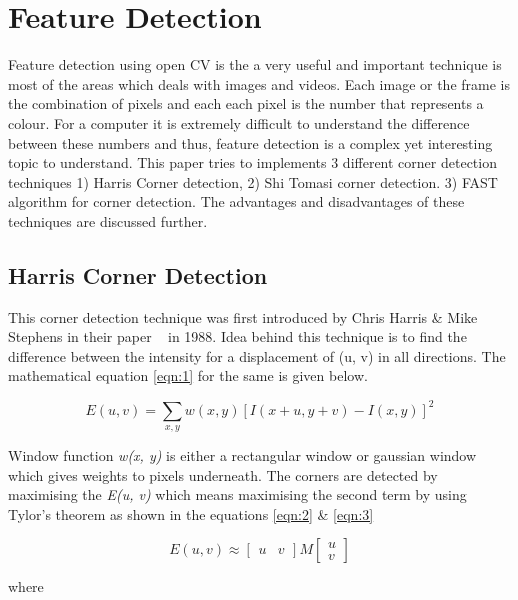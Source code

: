 \chapter{Feature Detection}
Feature detection using open CV is the a very useful and important technique is most of the areas which deals with images and videos. Each image or the frame is the combination of pixels and each each pixel is the number that represents a colour. For a computer it is extremely difficult to understand the difference between these numbers and thus, feature detection is a complex yet interesting topic to understand. This paper tries to implements 3 different corner detection techniques 1) Harris Corner detection, 2) Shi Tomasi corner detection. 3) FAST algorithm for corner detection. The advantages and disadvantages of these techniques are discussed further.
\section{Harris Corner Detection}
 This corner detection technique was first introduced by Chris Harris \& Mike Stephens in their paper ~\cite{harris1988combined} in 1988. Idea behind this technique is to find the difference between the intensity for a displacement of (u, v) in all directions. The mathematical equation \ref{eqn:1} for the same is given below.
 
 \begin{equation}\label{eqn:1}
    E(u, v) = \sum_{x, y} w(x, y) [I(x+u, y+v)-I(x, y)]^{2}
 \end{equation}

Window function \textit{w(x, y)} is either a rectangular window or gaussian window which gives weights to pixels underneath. The corners are detected by maximising the \textit{E(u, v)} which means maximising the second term by using Tylor's theorem as shown in the equations \ref{eqn:2} \& \ref{eqn:3}

 \begin{equation}\label{eqn:2}
    	E(u, v) \approx 
	\begin{bmatrix} 
		u & v
	\end{bmatrix} 
	M
	\begin{bmatrix}
		u\\v 
	\end{bmatrix}
\end{equation}

where

